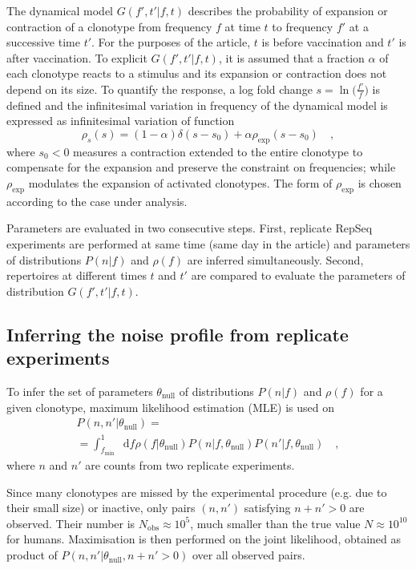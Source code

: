 \documentclass[a4paper,twocolumn]{article}
\newcommand{\dd}{\mathop{}\!\mathrm{d}}
\begin{document}
The dynamical model $G(f', t'|f, t)$ describes the probability of expansion or contraction of a clonotype from frequency $f$ at time $t$ to frequency $f'$ at a successive time $t'$. For the purposes of the article, $t$ is before vaccination and $t'$ is after vaccination. To explicit $G(f', t'|f, t)$, it is assumed that a fraction $\alpha$ of each clonotype reacts to a stimulus and its expansion or contraction does not depend on its size. To quantify the response, a log fold change $s = \ln \big( \frac{f'}{f} \big)$ is defined and the infinitesimal variation in frequency of the dynamical model is expressed as infinitesimal variation of function
\begin{equation*}
  \rho_s(s) = (1 - \alpha) \delta(s - s_0) + \alpha \rho_\mathrm{exp} (s - s_0) \quad ,
\end{equation*}
where $s_0 < 0$ measures a contraction extended to the entire clonotype to compensate for the expansion and preserve the constraint on frequencies; while $\rho_\mathrm{exp}$ modulates the expansion of activated clonotypes. The form of $\rho_\mathrm{exp}$ is chosen according to the case under analysis.

Parameters are evaluated in two consecutive steps. First, replicate RepSeq experiments are performed at same time (same day in the article) and parameters of distributions $P(n|f)$ and $\rho(f)$ are inferred simultaneously. Second, repertoires at different times $t$ and $t'$ are compared to evaluate the parameters of distribution $G(f', t'|f, t)$.

\subsection{Inferring the noise profile from replicate experiments}
To infer the set of parameters $\theta_\mathrm{null}$ of distributions $P(n|f)$ and $\rho(f)$ for a given clonotype, maximum likelihood estimation (MLE) is used on
\begin{multline*}
  P(n, n'|\theta_\mathrm{null}) = \\
  = \int_{f_\mathrm{min}}^1 \dd{f} \rho(f|\theta_\mathrm{null}) P(n|f, \theta_\mathrm{null}) P(n'|f, \theta_\mathrm{null}) \quad ,
\end{multline*}
where $n$ and $n'$ are counts from two replicate experiments.

Since many clonotypes are missed by the experimental procedure (e.g. due to their small size) or inactive, only pairs $(n, n')$ satisfying $n + n' > 0$ are observed. Their number is $N_\mathrm{obs} \approx 10^5$, much smaller than the true value $N \approx 10^{10}$ for humans. Maximisation is then performed on the joint likelihood, obtained as product of $P(n, n'|\theta_\mathrm{null}, n + n' > 0)$ over all observed pairs.
\end{document}
